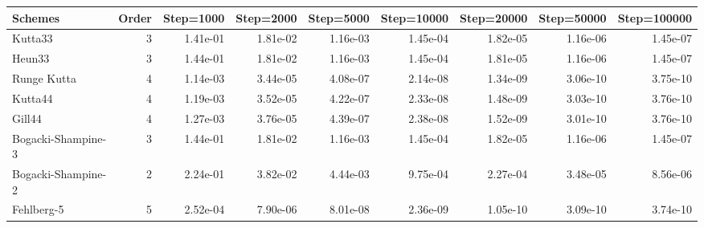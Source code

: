 \documentclass[conference,onecolumn,12pt]{IEEEtran}
\begin{document}
\begin{table}[htbp]
{    \begin{tabular}{lrccccccc}
      \toprule
    Schemes & \multicolumn{1}{l}{Order} & \multicolumn{1}{l}{Step=1000} & \multicolumn{1}{l}{Step=2000} & \multicolumn{1}{l}{Step=5000} & \multicolumn{1}{l}{Step=10000} & \multicolumn{1}{l}{Step=20000} & \multicolumn{1}{l}{Step=50000} & \multicolumn{1}{l}{Step=100000} \\
    \midrule
    Kutta33 & 3     & \multicolumn{1}{r}{1.41e-01} & \multicolumn{1}{r}{1.81e-02} & \multicolumn{1}{r}{1.16e-03} & \multicolumn{1}{r}{1.45e-04} & \multicolumn{1}{r}{1.82e-05} & \multicolumn{1}{r}{1.16e-06} & \multicolumn{1}{r}{1.45e-07} \\
    Heun33 & 3     & \multicolumn{1}{r}{1.44e-01} & \multicolumn{1}{r}{1.81e-02} & \multicolumn{1}{r}{1.16e-03} & \multicolumn{1}{r}{1.45e-04} & \multicolumn{1}{r}{1.81e-05} & \multicolumn{1}{r}{1.16e-06} & \multicolumn{1}{r}{1.45e-07} \\
    Runge Kutta & 4     & \multicolumn{1}{r}{1.14e-03} & \multicolumn{1}{r}{3.44e-05} & \multicolumn{1}{r}{4.08e-07} & \multicolumn{1}{r}{2.14e-08} & \multicolumn{1}{r}{1.34e-09} & \multicolumn{1}{r}{3.06e-10} & \multicolumn{1}{r}{3.75e-10} \\
    Kutta44 & 4     & \multicolumn{1}{r}{1.19e-03} & \multicolumn{1}{r}{3.52e-05} & \multicolumn{1}{r}{4.22e-07} & \multicolumn{1}{r}{2.33e-08} & \multicolumn{1}{r}{1.48e-09} & \multicolumn{1}{r}{3.03e-10} & \multicolumn{1}{r}{3.76e-10} \\
    Gill44 & 4     & \multicolumn{1}{r}{1.27e-03} & \multicolumn{1}{r}{3.76e-05} & \multicolumn{1}{r}{4.39e-07} & \multicolumn{1}{r}{2.38e-08} & \multicolumn{1}{r}{1.52e-09} & \multicolumn{1}{r}{3.01e-10} & \multicolumn{1}{r}{3.76e-10} \\
    Bogacki-Shampine-3 & 3     & \multicolumn{1}{r}{1.44e-01} & \multicolumn{1}{r}{1.81e-02} & \multicolumn{1}{r}{1.16e-03} & \multicolumn{1}{r}{1.45e-04} & \multicolumn{1}{r}{1.82e-05} & \multicolumn{1}{r}{1.16e-06} & \multicolumn{1}{r}{1.45e-07} \\
    Bogacki-Shampine-2 & 2     & \multicolumn{1}{r}{2.24e-01} & \multicolumn{1}{r}{3.82e-02} & \multicolumn{1}{r}{4.44e-03} & \multicolumn{1}{r}{9.75e-04} & \multicolumn{1}{r}{2.27e-04} & \multicolumn{1}{r}{3.48e-05} & \multicolumn{1}{r}{8.56e-06} \\
    Fehlberg-5 & 5     & \multicolumn{1}{r}{2.52e-04} & \multicolumn{1}{r}{7.90e-06} & \multicolumn{1}{r}{8.01e-08} & \multicolumn{1}{r}{2.36e-09} & \multicolumn{1}{r}{1.05e-10} & \multicolumn{1}{r}{3.09e-10} & \multicolumn{1}{r}{3.74e-10} \\

\end{tabular}}
\end{table}
\end{document}

